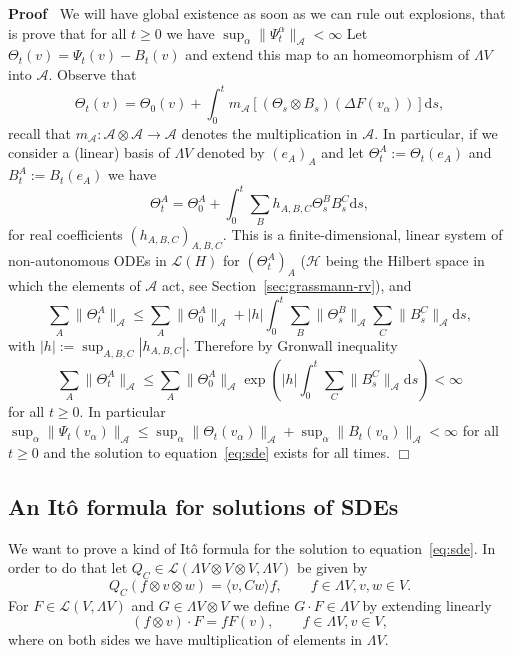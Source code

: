 \documentclass[11pt]{article}
\newcommand{\assign}{:=}
\newcommand{\mathd}{\mathrm{d}}
\newenvironment{proof}{\noindent\textbf{Proof\ }}{\hspace*{\fill}$\Box$\medskip}
\begin{document}
\begin{proof}
  We will have global existence as soon as we can rule out explosions, that is
  prove that for all $t \geqslant 0$ we have $\sup_{\alpha} \| \Psi_t^{\alpha}
  \|_{\mathcal{A}} < \infty$ Let $\Theta_t (v) = \Psi_t (v) - B_t (v)$ and
  extend this map to an homeomorphism of $\Lambda V$ into $\mathcal{A}$.
  Observe that
  \[ \Theta_t (v) = \Theta_0 (v) + \int_0^t m_{\mathcal{A}} [(\Theta_s \otimes
     B_s) (\Delta F (v_{\alpha}))] \mathd s, \]
  recall that $m_{\mathcal{A}} : \mathcal{A} \otimes \mathcal{A} \rightarrow
  \mathcal{A}$ denotes the multiplication in $\mathcal{A}$. In particular, if
  we consider a (linear) basis of $\Lambda V$ denoted by $(e_A)_A$ and let
  $\Theta^A_t \assign \Theta_t (e_A)$ and $B^A_t \assign B_t (e_A)$ we have
  \[ \Theta_t^A = \Theta_0^A + \int_0^t \sum_B h_{A, B, C} \Theta_s^B B_s^C
     \mathd s, \]
  for real coefficients $(h_{A, B, C})_{A, B, C}$. This is a
  finite-dimensional, linear system of non-autonomous ODEs in $\mathcal{L}
  (H)$ for $(\Theta_t^A)_A$ ($\mathcal{H}$ being the Hilbert space in which
  the elements of $\mathcal{A}$ act, see Section~\ref{sec:grassmann-rv}), and
  \[ \sum_A \| \Theta_t^A \|_{\mathcal{A}} \leqslant \sum_A \| \Theta_0^A
     \|_{\mathcal{A}} + | h | \int_0^t \sum_B \| \Theta_s^B \|_{\mathcal{A}}
     \sum_C \| B_s^C \|_{\mathcal{A}} \mathd s, \]
  with $| h | \assign \sup_{A, B, C} | h_{A, B, C} |$. Therefore by Gronwall
  inequality
  \[ \sum_A \| \Theta_t^A \|_{\mathcal{A}} \leqslant \sum_A \| \Theta_0^A
     \|_{\mathcal{A}} \exp \left( | h | \int_0^t \sum_C \| B_s^C
     \|_{\mathcal{A}} \mathd s \right) < \infty \]
  for all $t \geqslant 0$. In particular $\sup_{\alpha} \| \Psi_t (v_{\alpha})
  \|_{\mathcal{A}} \leqslant \sup_{\alpha} \| \Theta_t (v_{\alpha})
  \|_{\mathcal{A}} + \sup_{\alpha} \| B_t (v_{\alpha}) \|_{\mathcal{A}} <
  \infty$ for all $t \geqslant 0$ and the solution to
  equation~{\eqref{eq:sde}} exists for all times.
\end{proof}

\subsection{An It{\^o} formula for solutions of SDEs}

We want to prove a kind of It{\^o} formula for the solution to
equation~{\eqref{eq:sde}}. In order to do that let $Q_C \in \mathcal{L}
(\Lambda V \otimes V \otimes V, \Lambda V)$ be given by
\begin{equation}
  Q_C (f \otimes v \otimes w) = \langle v, C w \rangle f, \qquad f \in \Lambda
  V, v, w \in V. \label{eq:QC}
\end{equation}
For $F \in \mathcal{L} (V, \Lambda V)$ and $G \in \Lambda V \otimes V$ we
define $G \cdot F \in \Lambda V$ by extending linearly
\[ (f \otimes v) \cdot F = f F (v), \qquad f \in \Lambda V, v \in V, \]
where on both sides we have multiplication of elements in $\Lambda V$.
\end{document}
